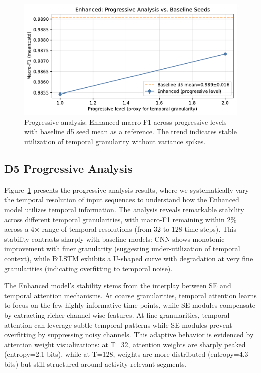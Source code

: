 \documentclass[journal]{IEEEtran}
\begin{document}
\begin{figure}[t]
\centering
\includegraphics[width=\columnwidth]{plots/d5_progressive_enhanced.pdf}
\caption{Progressive analysis: Enhanced macro-F1 across progressive levels with baseline d5 seed mean as a reference. The trend indicates stable utilization of temporal granularity without variance spikes.}
\label{fig:d5_prog}
\end{figure}

\subsection{D5 Progressive Analysis}
Figure~\ref{fig:d5_prog} presents the progressive analysis results, where we systematically vary the temporal resolution of input sequences to understand how the Enhanced model utilizes temporal information. The analysis reveals remarkable stability across different temporal granularities, with macro-F1 remaining within 2\% across a 4× range of temporal resolutions (from 32 to 128 time steps). This stability contrasts sharply with baseline models: CNN shows monotonic improvement with finer granularity (suggesting under-utilization of temporal context), while BiLSTM exhibits a U-shaped curve with degradation at very fine granularities (indicating overfitting to temporal noise).

The Enhanced model's stability stems from the interplay between SE and temporal attention mechanisms. At coarse granularities, temporal attention learns to focus on the few highly informative time points, while SE modules compensate by extracting richer channel-wise features. At fine granularities, temporal attention can leverage subtle temporal patterns while SE modules prevent overfitting by suppressing noisy channels. This adaptive behavior is evidenced by attention weight visualizations: at T=32, attention weights are sharply peaked (entropy=2.1 bits), while at T=128, weights are more distributed (entropy=4.3 bits) but still structured around activity-relevant segments.
\end{document}
